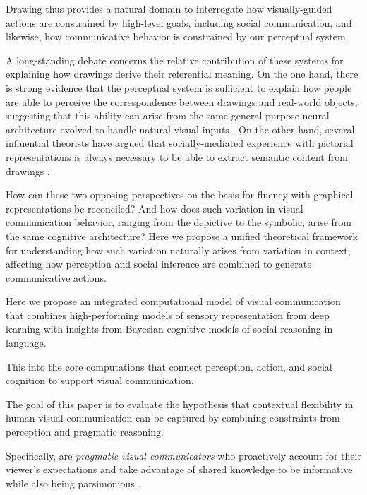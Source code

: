 \documentclass[9pt,twocolumn,twoside]{pnas-new}
\begin{document}
Drawing thus provides a natural domain to interrogate how visually-guided actions are constrained by high-level goals, including social communication, and likewise, how communicative behavior is constrained by our perceptual system.

A long-standing debate concerns the relative contribution of these systems for explaining how drawings derive their referential meaning. On the one hand, there is strong evidence that the perceptual system is sufficient to explain how people are able to perceive the correspondence between drawings and real-world objects, suggesting that this ability can arise from the same general-purpose neural architecture evolved to handle natural visual inputs
\cite{fan2015common, yamins2014performance}. On the other hand, several influential theorists have argued that socially-mediated experience with pictorial representations is always necessary to be able to extract semantic content from drawings \cite{goodman1976languages,gombrich1989story}.

How can these two opposing perspectives on the basis for fluency with graphical representations be reconciled? And how does such variation in visual communication behavior, ranging from the depictive to the symbolic, arise from the same cognitive architecture? Here we propose a unified theoretical framework for understanding how such variation naturally arises from variation in context, affecting how perception and social inference are combined to generate communicative actions.


Here we propose an integrated computational model of visual communication that combines high-performing models of sensory representation from deep learning with insights from Bayesian cognitive models of social reasoning in language.

This  into the core computations that connect perception, action, and social cognition to support visual communication.


The goal of this paper is to evaluate the hypothesis that contextual flexibility in human visual communication can be captured by combining constraints from perception and pragmatic reasoning.

Specifically, are \emph{pragmatic visual communicators} who proactively account for their viewer's expectations and take advantage of shared knowledge to be informative
\cite{wilson1986relevance,goodman2016pragmatic}
while also being parsimonious \cite{zipf1936psycho}.
\end{document}
